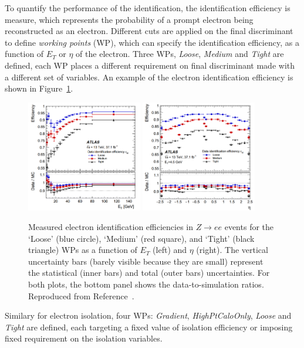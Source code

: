 To quantify the performance of the identification, 
the identification efficiency is measure, which represents the probability of
a prompt electron being reconstructed as an electron.
Different cuts are applied on the final discriminant
to define \textit{working points} (WP), which can specify 
the identification efficiency, as a function of $E_T$ or $\eta$ of the electron. 
Three WPs, \textit{Loose}, \textit{Medium} and \textit{Tight} are defined, 
each WP places a different requirement on final discriminant 
made with a different set of variables. 
An example of the electron identification efficiency 
is shown in Figure~\ref{fig:electron_ID}.
\begin{figure}[bht]
    \begin{centering}	
    \includegraphics[width=0.45\textwidth]{Reconstruction/plots/electrond_ID1.png}
    \includegraphics[width=0.45\textwidth]{Reconstruction/plots/electrond_ID2.png}
    \caption{Measured electron identification efficiencies in $Z \rightarrow ee$
    events for the `Loose' (blue circle), `Medium' (red square), 
    and `Tight' (black triangle) WPs as a function of $E_T$ (left) and $\eta$ (right). 
    The vertical uncertainty bars (barely visible because they are small) 
    represent the statistical (inner bars) and total (outer bars) uncertainties. 
    For both plots, the bottom panel shows the data-to-simulation
    ratios. Reproduced from Reference~\cite{PERF-2017-01}.}
    \label{fig:electron_ID}
    \end{centering}
\end{figure}
Similary for electron isolation, 
four WPs: \textit{Gradient}, \textit{HighPtCaloOnly}, \textit{Loose} and \textit{Tight} 
are defined, each targeting a fixed value of isolation efficiency
or imposing fixed requirement on the isolation variables. 

